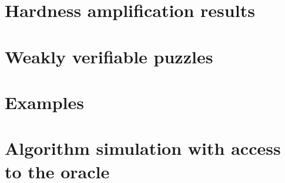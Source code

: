 \section{Hardness amplification results}

\section{Weakly verifiable puzzles}

\section{Examples}

\section{Algorithm simulation with access to the oracle}


